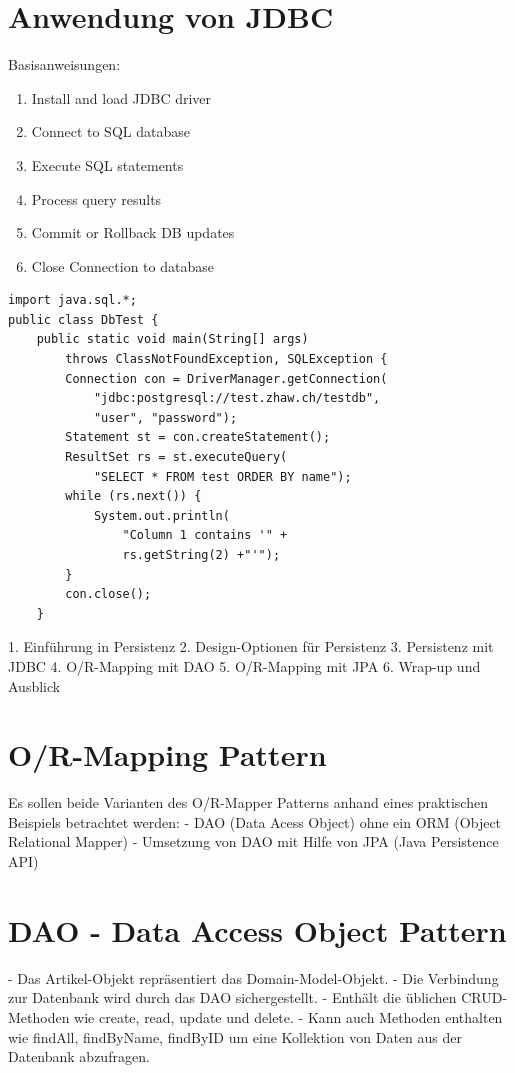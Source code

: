 \documentclass[10pt]{article}
\begin{document}
\section*{Anwendung von JDBC}
Basisanweisungen:

\begin{enumerate}
  \item Install and load JDBC driver
  \item Connect to SQL database
  \item Execute SQL statements
  \item Process query results
  \item Commit or Rollback DB updates
  \item Close Connection to database
\end{enumerate}

\begin{verbatim}
import java.sql.*;
public class DbTest {
    public static void main(String[] args)
        throws ClassNotFoundException, SQLException {
        Connection con = DriverManager.getConnection(
            "jdbc:postgresql://test.zhaw.ch/testdb",
            "user", "password");
        Statement st = con.createStatement();
        ResultSet rs = st.executeQuery(
            "SELECT * FROM test ORDER BY name");
        while (rs.next()) {
            System.out.println(
                "Column 1 contains '" +
                rs.getString(2) +"'");
        }
        con.close();
    }

  \end{verbatim}

1. Einführung in Persistenz
2. Design-Optionen für Persistenz
3. Persistenz mit JDBC
4. O/R-Mapping mit DAO
5. O/R-Mapping mit JPA
6. Wrap-up und Ausblick

\section*{O/R-Mapping Pattern}

Es sollen beide Varianten des O/R-Mapper Patterns anhand eines praktischen Beispiels betrachtet werden:
- DAO (Data Acess Object) ohne ein ORM (Object Relational Mapper)
- Umsetzung von DAO mit Hilfe von JPA (Java Persistence API)

\section*{DAO - Data Access Object Pattern}
- Das Artikel-Objekt repräsentiert das Domain-Model-Objekt.
- Die Verbindung zur Datenbank wird durch das DAO sichergestellt.
- Enthält die üblichen CRUD-Methoden wie create, read, update und delete.
- Kann auch Methoden enthalten wie findAll, findByName, findByID um eine Kollektion von Daten aus der Datenbank abzufragen.
\end{document}
